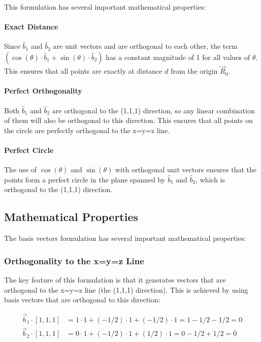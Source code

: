 This formulation has several important mathematical properties:

\paragraph{Exact Distance} Since $\hat{b}_1$ and $\hat{b}_2$ are unit vectors and are orthogonal to each other, the term $(\cos(\theta) \cdot \hat{b}_1 + \sin(\theta) \cdot \hat{b}_2)$ has a constant magnitude of 1 for all values of $\theta$. This ensures that all points are exactly at distance $d$ from the origin $\vec{R}_0$.

\paragraph{Perfect Orthogonality} Both $\hat{b}_1$ and $\hat{b}_2$ are orthogonal to the (1,1,1) direction, so any linear combination of them will also be orthogonal to this direction. This ensures that all points on the circle are perfectly orthogonal to the x=y=z line.

\paragraph{Perfect Circle} The use of $\cos(\theta)$ and $\sin(\theta)$ with orthogonal unit vectors ensures that the points form a perfect circle in the plane spanned by $\hat{b}_1$ and $\hat{b}_2$, which is orthogonal to the (1,1,1) direction.

\subsection{Mathematical Properties}

The basis vectors formulation has several important mathematical properties:

\subsubsection{Orthogonality to the x=y=z Line}

The key feature of this formulation is that it generates vectors that are orthogonal to the x=y=z line (the (1,1,1) direction). This is achieved by using basis vectors that are orthogonal to this direction:

\begin{align}
\vec{b}_1 \cdot [1,1,1] &= 1 \cdot 1 + (-1/2) \cdot 1 + (-1/2) \cdot 1 = 1 - 1/2 - 1/2 = 0 \\
\vec{b}_2 \cdot [1,1,1] &= 0 \cdot 1 + (-1/2) \cdot 1 + (1/2) \cdot 1 = 0 - 1/2 + 1/2 = 0
\end{align}

